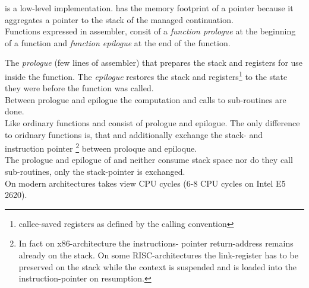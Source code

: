 
\cc is a low-level implementation. \cont has the memory footprint of a pointer
because it aggregates a pointer to the stack of the managed continuation.\\
\newline
Functions expressed in assembler, consit of a \emph{function prologue} at the
beginning of a function and \emph{function epilogue} at the end of the function.

The \emph{prologue} (few lines of assembler) that prepares the stack and
registers for use inside the function. The \emph{epilogue} restores the stack
and registers\footnote{callee-saved registers as defined by the calling
convention} to the state they were before the function was called.\\
Between prologue and epilogue the computation and calls to sub-routines are
done.\\
\newline
Like ordinary functions \resume and \resumewith consist of prologue and
epilogue. The only difference to oridnary functions is, that \resume and
\resumewith additionally exchange the stack- and instruction pointer
\footnote{In fact on x86-architecture the instructions- pointer return-address
remains already on the stack. On some RISC-architectures the link-register
has to be preserved on the stack while the context is suspended and is loaded
into the instruction-pointer on resumption.} between proloque and epiloque.\\
The prologue and epilogue of \resume and \resumewith neither consume stack space
nor do they call sub-routines, only the stack-pointer is exchanged.\\
\newline
On modern architectures \callcc takes view CPU cycles (6-8 CPU cycles on Intel E5 2620).
